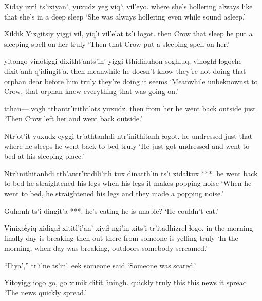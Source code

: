 \documentclass[12pt]{article}
\begin{document}
\gll Xiday izriɬ           ts'ixiyan', {yuxudz yeg} {viq'i viɬ'eyo.}
{where}     {she's hollering} always     {like that}      {she's in a deep sleep}
\glt `She was always hollering even while sound asleep.'
\glend

\gll Xiɬdik Yixgitsiy yiggi viɬ,  {yiq'i viɬ'elat}     ts'i ɬogot.
then   Crow      that  sleep {he put a sleeping spell on her} {} truly
\glt `Then that Crow put a sleeping spell on her.'
\glend

 yitongo   vinotiggi        {dixitht'ants'in'}  yiggi tthidinuhon soghluq, vinoghɬ    ɬogoche dixit'anh     q'idingit'a.
then               meanwhile {he doesn't know} {they're not doing} that  orphan      dear {before him} truly {they're doing} {it seems}
\glt `Meanwhile unbeknownst to Crow, that orphan knew everything that was going on.'
\glend

 tthan--- vogh     tthantr'ititht'ots yuxudz. 
then       {}    {from her} {he went back outside} just
\glt `Then Crow left her and went back outside.'
\glend

\gll Ntr'ot'it    yuxudz eyggi tr'athtanhdi    ntr'inithitanh      ɬogot.
  {he undressed} just   that  {where he sleeps} {he went back to bed} truly
\glt `He just got undressed and went to bed at his sleeping place.'
\glend

\gll Ntr'inithitanhdi    tth'antr'ixidili'ith tux   dinatth'in ts'i xidaɬtux ***.
{he went back to bed} {he straightened his legs} when {his legs} {}   {it makes popping noise}
\glt `When he went to bed, he straightened his legs and they made a popping noise.'
\glend

\gll Guhonh      ts'i dingit'a ***.
{he's eating} {} {he is}    unable?
\glt `He couldn't eat.'
\glend

\gll Vinixoɬyiq      xidigaɬ xititl'i'an'    xiyiɬ ngi'in    xits'i     tr'itadhizreɬ      ɬogo.
{in the morning} finally {day is breaking} then  {out there} from  {someone is yelling} truly
\glt `In the morning, when day was breaking, outdoors somebody screamed.'
\glend

\gll ``Iliya','' tr'i'ne ts'in'.
eek  {someone said}
\glt `Someone was scared.'
\glend

\gll Yitoyigg ɬogo  go,     go   xunik dititl'iningh.
quickly    truly this this news  {it spread}
\glt `The news quickly spread.'
\glend
\end{document}
